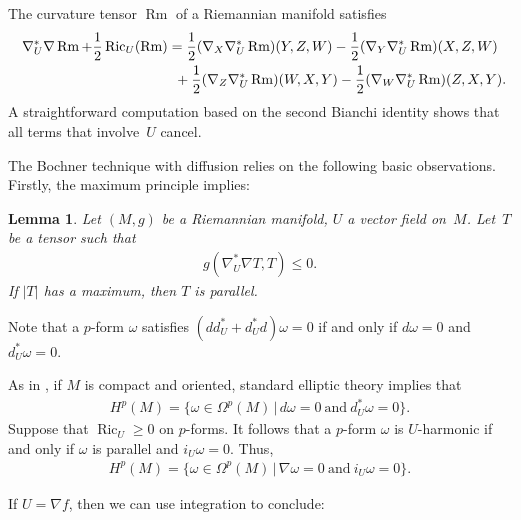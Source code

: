 \documentclass[10pt,a4paper]{amsart}
\numberwithin{equation}{section}
\newtheorem{Lemma}[Theorem]{Lemma}
\newcommand{\Ric} {\operatorname{Ric}}
\newcommand{\Rm} {\operatorname{Rm}}
\begin{document}
\begin{Remark}The curvature tensor $\Rm$ of a Riemannian manifold satisfies
\begin{gather*}
\nabla^{*}_U \nabla \Rm + \frac{1}{2} \Ric_U( \Rm ) =   \frac{1}{2}  ( \nabla_X \nabla_U^{*} \Rm )(Y,Z,W) - \frac{1}{2}  ( \nabla_Y \nabla_U^{*} \Rm  ) (X,Z,W) \\
\hphantom{\nabla^{*}_U \nabla \Rm + \frac{1}{2} \Ric_U( \Rm ) =}{} + \frac{1}{2}  ( \nabla_Z \nabla_U^{*} \Rm  )(W, X,Y) - \frac{1}{2}  ( \nabla_W \nabla_U^{*} \Rm  ) (Z,X,Y).
\end{gather*}
A straightforward computation based on the second Bianchi identity shows that all terms that involve~$U$ cancel.
\end{Remark}

The Bochner technique with diffusion relies on the following basic observations. Firstly, the maximum principle implies:

\begin{Lemma}\label{BochnerTechniqueWithDiffusion}
Let $(M,g)$ be a Riemannian manifold, $U$ a vector field on~$M$. Let~$T$ be a tensor such that
\begin{gather*}
g ( \nabla_U^{*} \nabla T, T) \leq 0.
\end{gather*}
If $| T |$ has a maximum, then $T$ is parallel.
\end{Lemma}

\begin{Remark}\label{IsomorphismDeRhamColomology}
Note that a $p$-form $\omega$ satisfies $(dd^{*}_U + d^{*}_Ud ) \omega = 0$ if and only if $d \omega =0$ and $d^{*}_U \omega = 0$.

As in \cite{LottGeometryBETensor}, if $M$ is compact and oriented, standard elliptic theory implies that
\begin{gather*}
H^p(M) = \big\lbrace \omega \in \Omega^p(M) \, \vert \, d \omega =0 \ \text{and} \ d^{*}_U \omega = 0 \big\rbrace.
\end{gather*}
Suppose that $\Ric_U \geq 0$ on $p$-forms. It follows that a $p$-form $\omega$ is $U$-harmonic if and only if $\omega$ is parallel and $i_U \omega = 0$. Thus,
\begin{gather*}
H^{p}(M)= \big\lbrace \omega \in \Omega^p(M) \, \vert \, \nabla \omega =0 \ \text{and} \ i_{U} \omega = 0 \big\rbrace.
\end{gather*}
\end{Remark}

If $U=\nabla f$, then we can use integration to conclude:
\end{document}
